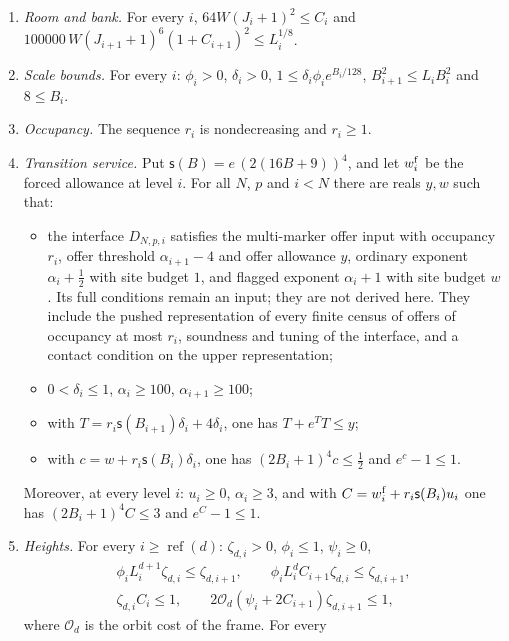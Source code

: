 \begin{enumerate}
\item[(R1)] \emph{Room and bank.} For every $i$,
  $64W(J_i+1)^2\leq C_i$ and
  $100000\,W(J_{i+1}+1)^6(1+C_{i+1})^2\leq L_i^{1/8}$.
\item[(R2)] \emph{Scale bounds.} For every $i$: $\phi_i>0$,
  $\delta_i>0$, $1\leq\delta_i\phi_ie^{B_i/128}$,
  $B_{i+1}^2\leq L_iB_i^2$ and $8\leq B_i$.
\item[(R3)] \emph{Occupancy.} The sequence $r_i$ is nondecreasing and
  $r_i\geq1$.
\item[(R4)] \emph{Transition service.} Put
  $\mathsf s(B)=e\,(2(16B+9))^4$, and let $w^{\rm f}_i$ be the forced
  allowance at level $i$. For all $N$, $p$ and $i<N$ there are reals
  $y,w$ such that:
  \begin{itemize}
  \item the interface $D_{N,p,i}$ satisfies the multi-marker offer input
    with occupancy $r_i$, offer
    threshold $\alpha_{i+1}-4$ and offer allowance $y$, ordinary
    exponent $\alpha_i+\frac12$ with site budget $1$, and flagged
    exponent $\alpha_i+1$ with site budget $w$. Its full conditions
    remain an input; they are not derived here. They include the pushed representation of every finite census of
    offers of occupancy at most $r_i$, soundness and tuning of the interface,
    and a contact condition on the upper representation;
  \item $0<\delta_i\leq1$, $\alpha_i\geq100$, $\alpha_{i+1}\geq100$;
  \item with $T=r_i\mathsf s(B_{i+1})\delta_i+4\delta_i$, one has
    $T+e^TT\leq y$;
  \item with $c=w+r_i\mathsf s(B_i)\delta_i$, one has
    $(2B_i+1)^4c\leq\frac12$ and $e^{c}-1\leq1$.
  \end{itemize}
  Moreover, at every level $i$: $u_i\geq0$, $\alpha_i\geq3$, and with
  $C=w^{\rm f}_i+r_i\mathsf s(B_i)u_i$ one has $(2B_i+1)^4C\leq3$ and
  $e^{C}-1\leq1$.
\item[(R5)] \emph{Heights.} For every $i\geq\operatorname{ref}(d)$:
  $\zeta_{d,i}>0$, $\phi_i\leq1$, $\psi_i\geq0$,
  \begin{gather*}
   \phi_iL_i^{d+1}\zeta_{d,i}\leq\zeta_{d,i+1},\qquad
   \phi_iL_i^{d}C_{i+1}\zeta_{d,i}\leq\zeta_{d,i+1},\\
   \zeta_{d,i}C_i\leq1,\qquad
   2\mathcal O_d(\psi_i+2C_{i+1})\zeta_{d,i+1}\leq1,
  \end{gather*}
  where $\mathcal O_d$ is the orbit cost of the frame. For every

\end{enumerate}
